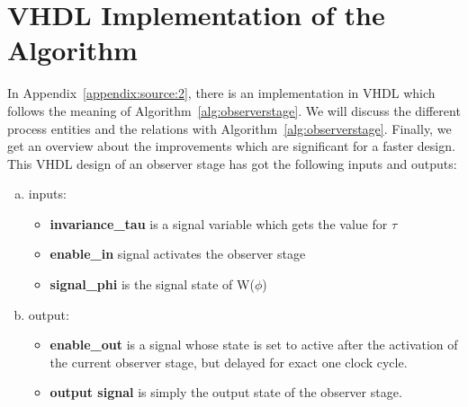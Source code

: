 \section{VHDL Implementation of the Algorithm}  
\label{chapter:sub:2}
In Appendix~\ref{appendix:source:2}, there is an implementation in VHDL which follows the meaning of Algorithm~\ref{alg:observerstage}. 
We will discuss the different process entities and the relations with Algorithm~\ref{alg:observerstage}. 
Finally, we get an overview about the improvements which are significant for a faster design. 
This VHDL design of an observer stage has got the following inputs and outputs:
\begin{enumerate}[(a)]
\item inputs:
\begin{itemize}
\item \textbf{invariance\_tau} is a signal variable which gets the value for $\tau$
\item \textbf{enable\_in} signal activates the observer stage
\item \textbf{signal\_phi} is the signal state of W($\phi$)
\end{itemize}
\newpage
\item output:
\begin{itemize}
\item \textbf{enable\_out} is a signal whose state is set to active after the activation of the current observer stage, but delayed for exact one clock cycle. 
\item \textbf{output signal} is simply the output state of the observer stage. 
\end{itemize}
\end{enumerate}

